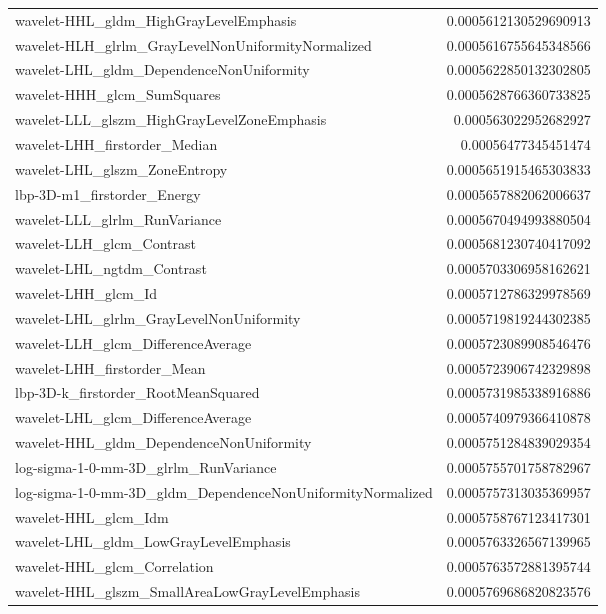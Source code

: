 {\begin{xltabular}[H]{\textwidth}{X r}
        wavelet-HHL\_gldm\_HighGrayLevelEmphasis & 0.0005612130529690913 \\
        wavelet-HLH\_glrlm\_GrayLevelNonUniformityNormalized & 0.0005616755645348566 \\
        wavelet-LHL\_gldm\_DependenceNonUniformity & 0.0005622850132302805 \\
        wavelet-HHH\_glcm\_SumSquares & 0.0005628766360733825 \\
        wavelet-LLL\_glszm\_HighGrayLevelZoneEmphasis & 0.000563022952682927 \\
        wavelet-LHH\_firstorder\_Median & 0.00056477345451474 \\
        wavelet-LHL\_glszm\_ZoneEntropy & 0.0005651915465303833 \\
        lbp-3D-m1\_firstorder\_Energy & 0.0005657882062006637 \\
        wavelet-LLL\_glrlm\_RunVariance & 0.0005670494993880504 \\
        wavelet-LLH\_glcm\_Contrast & 0.0005681230740417092 \\
        wavelet-LHL\_ngtdm\_Contrast & 0.0005703306958162621 \\
        wavelet-LHH\_glcm\_Id & 0.0005712786329978569 \\
        wavelet-LHL\_glrlm\_GrayLevelNonUniformity & 0.0005719819244302385 \\
        wavelet-LLH\_glcm\_DifferenceAverage & 0.0005723089908546476 \\
        wavelet-LHH\_firstorder\_Mean & 0.0005723906742329898 \\
        lbp-3D-k\_firstorder\_RootMeanSquared & 0.0005731985338916886 \\
        wavelet-LHL\_glcm\_DifferenceAverage & 0.0005740979366410878 \\
        wavelet-HHL\_gldm\_DependenceNonUniformity & 0.0005751284839029354 \\
        log-sigma-1-0-mm-3D\_glrlm\_RunVariance & 0.0005755701758782967 \\
        log-sigma-1-0-mm-3D\_gldm\_DependenceNonUniformityNormalized & 0.0005757313035369957 \\
        wavelet-HHL\_glcm\_Idm & 0.0005758767123417301 \\
        wavelet-LHL\_gldm\_LowGrayLevelEmphasis & 0.0005763326567139965 \\
        wavelet-HHL\_glcm\_Correlation & 0.0005763572881395744 \\
        wavelet-HHL\_glszm\_SmallAreaLowGrayLevelEmphasis & 0.0005769686820823576 \\

\end{xltabular}}

